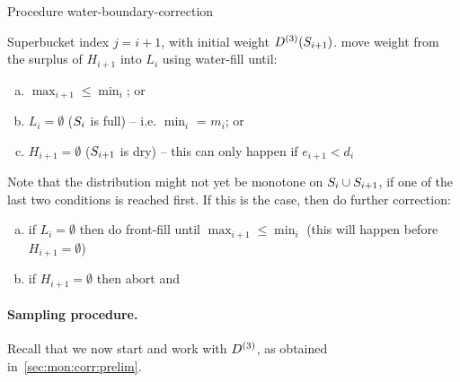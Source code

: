\begin{algorithm}[H]
  \caption{Procedure \textsf{water-boundary-correction}}
  \begin{algorithmic}[1]
    \Require Superbucket index $j=i+1$, {with initial weight $D^{(3)}(S_{i+1})$.}
   \State move weight from the surplus of $H_{i+1}$ into $L_{i}$ using \textsf{water-fill} until:
    \begin{enumerate}[(a)]
      \item $\max_{i+1} \leq \min_i$; or
      \item $L_{i}=\emptyset$ ($S_i$ is full) -- i.e. $\min_i$ = $m_i$; or
      \item $H_{i+1}=\emptyset$ ($S_{i+1}$ is dry) -- this can only happen if $e_{i+1} < d_i$ 
    \end{enumerate}
  \State Note that the distribution might not yet be monotone on $S_i\cup S_{i+1}$, if one of the last two conditions is reached first. If this is the case, then do further correction:
    \begin{enumerate}[(a)]
      \item if $L_{i}=\emptyset$  then do \textsf{front-fill} until $\max_{i+1} \leq \min_i$  (this will happen before $H_{i+1}=\emptyset$)
      \item if $H_{i+1}=\emptyset$ then abort and \Return \fail {}
          \end{enumerate}
  \end{algorithmic}
  \end{algorithm}

\paragraph{Sampling procedure.}
Recall that we now start and work with $D^{(3)}$, as obtained in~\autoref{sec:mon:corr:prelim}.

